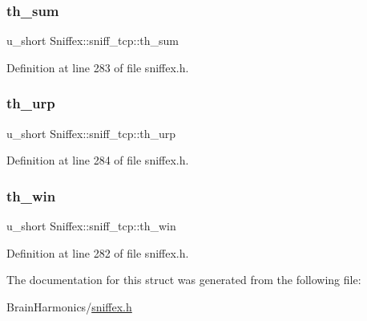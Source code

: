 \subsubsection{\texorpdfstring{th\+\_\+sum}{th\_sum}}
{\footnotesize\ttfamily u\+\_\+short Sniffex\+::sniff\+\_\+tcp\+::th\+\_\+sum}



Definition at line 283 of file sniffex.\+h.

\mbox{\label{struct_sniffex_1_1sniff__tcp_a9f030cb6718b8d828f242d0464560761}} 
\subsubsection{\texorpdfstring{th\+\_\+urp}{th\_urp}}
{\footnotesize\ttfamily u\+\_\+short Sniffex\+::sniff\+\_\+tcp\+::th\+\_\+urp}



Definition at line 284 of file sniffex.\+h.

\mbox{\label{struct_sniffex_1_1sniff__tcp_aa8b7d8b1967e81a255ec9362f681c721}} 
\subsubsection{\texorpdfstring{th\+\_\+win}{th\_win}}
{\footnotesize\ttfamily u\+\_\+short Sniffex\+::sniff\+\_\+tcp\+::th\+\_\+win}



Definition at line 282 of file sniffex.\+h.



The documentation for this struct was generated from the following file\+:\begin{DoxyCompactItemize}
\item 
Brain\+Harmonics/\hyperlink{sniffex_8h}{sniffex.\+h}\end{DoxyCompactItemize}
